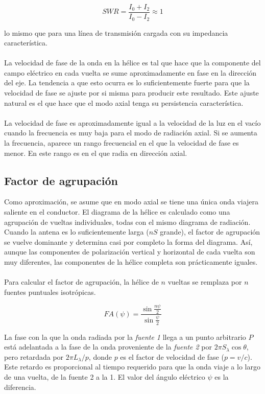 \documentclass[12pt]{article}
\begin{document}
\begin{equation*}
	SWR=\frac{I_{0}+I_{2}}{I_{0}-I_{2}}\approx 1
\end{equation*}

lo mismo que para una línea de transmisión cargada con su impedancia característica.\\\\
La velocidad de fase de la onda en la hélice es tal que hace que la componente del campo eléctrico en cada vuelta se sume aproximadamente en fase en la dirección del eje. La tendencia a que esto ocurra es lo suficientemente fuerte para que la velocidad de fase se ajuste por si misma para producir este resultado. Este ajuste natural es el que hace que el modo axial tenga su persistencia característica.\\\\
La velocidad de fase es aproximadamente igual a la velocidad de la luz en el vacío cuando la frecuencia es muy baja para el modo de radiación axial. Si se aumenta la frecuencia, aparece un rango frecuencial en el que la velocidad de fase es menor. En este rango es en el que radia en  dirección axial.

\subsection{Factor de agrupación}
Como aproximación, se asume que en modo axial se tiene una única onda viajera saliente en el conductor. El diagrama de la hélice es calculado como una agrupación de vueltas individuales, todas con el mismo diagrama de radiación. Cuando la antena es lo suficientemente larga ($nS$ grande), el factor de agrupación se vuelve dominante y determina casi por completo la forma del diagrama. Así, aunque las componentes de polarización vertical y horizontal de cada vuelta son muy diferentes, las componentes de la hélice completa son prácticamente iguales.\\\\
Para calcular el factor de agrupación, la hélice de $n$ vueltas se remplaza por $n$ fuentes puntuales isotrópicas.

\begin{equation}
	FA(\psi)=\frac{\sin\frac{n\psi}{2}}{\sin\frac{\psi}{2}}
\end{equation} 

La fase con la que la onda radiada por la \textit{fuente 1} llega a un punto arbitrario $P$ está adelantada a la fase de la onda proveniente de la \textit{fuente 2} por $2\pi S_{\lambda}\cos\theta$, pero retardada por $2\pi L_{\lambda}/p$, donde $p$ es el factor de velocidad de fase ($p=v/c$). Este retardo es proporcional al tiempo requerido para que la onda viaje a lo largo de una vuelta, de la fuente 2 a la 1. El valor del ángulo eléctrico $\psi$ es la diferencia.
\end{document}
